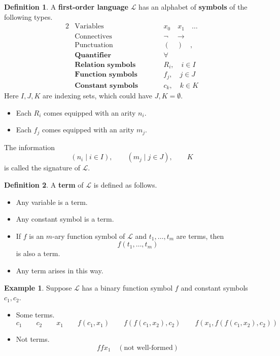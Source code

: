 \documentclass{article}
\renewcommand{\L}{\mathcal{L}}
\newcommand{\rb}[1]{\left( #1 \right)}
\theoremstyle{definition}\newtheorem{definition}{Definition}[subsection]
\theoremstyle{definition}\newtheorem{remark1}[definition]{Remark}
\theoremstyle{definition}\newtheorem{example1}[definition]{Example}
\theoremstyle{definition}\newtheorem*{remark2}{Remark}
\theoremstyle{definition}\newtheorem*{example2}{Example}
\theoremstyle{definition}\newtheorem*{note}{Note}
\theoremstyle{definition}\newtheorem*{notation}{Notation}
\begin{document}
\begin{definition}
\label{def:2.2.1}
A \textbf{first-order language} $ \L $ has an alphabet of \textbf{symbols} of the following types.
\begin{alignat*}{2}
& \text{Variables} & \qquad & x_0 \quad x_1 \quad \dots \\
& \text{Connectives} & \qquad & \neg \quad \rightarrow \\
& \text{Punctuation} & \qquad & ( \quad ) \quad , \\
& \textbf{Quantifier} & \qquad & \forall \\
& \textbf{Relation symbols} & \qquad & R_i, \quad i \in I \\
& \textbf{Function symbols} & \qquad & f_j, \quad j \in J \\
& \textbf{Constant symbols} & \qquad & c_k, \quad k \in K
\end{alignat*}
Here $ I, J, K $ are indexing sets, which could have $ J, K = \emptyset $.
\begin{itemize}
\item Each $ R_i $ comes equipped with an arity $ n_i $.
\item Each $ f_j $ comes equipped with an arity $ m_j $.
\end{itemize}
The information
$$ \rb{n_i \mid i \in I}, \qquad \rb{m_j \mid j \in J}, \qquad K $$
is called the signature of $ \L $.
\end{definition}

\pagebreak

\begin{definition}
A \textbf{term} of $ \L $ is defined as follows.
\begin{itemize}
\item Any variable is a term.
\item Any constant symbol is a term.
\item If $ f $ is an $ m $-ary function symbol of $ \L $ and $ t_1, \dots, t_m $ are terms, then
$$ f\rb{t_1, \dots, t_m} $$
is also a term.
\item Any term arises in this way.
\end{itemize}
\end{definition}

\begin{example2}
Suppose $ \L $ has a binary function symbol $ f $ and constant symbols $ c_1, c_2 $.
\begin{itemize}
\item Some terms.
$$ c_1 \qquad c_2 \qquad x_1 \qquad f\rb{c_1, x_1} \qquad f\rb{f\rb{c_1, x_2}, c_2} \qquad f\rb{x_1, f\rb{f\rb{c_1, x_2}, c_2}} $$
\item Not terms.
$$ ffx_1 \quad \rb{\text{not well-formed}} $$
\end{itemize}
\end{example2}
\end{document}
